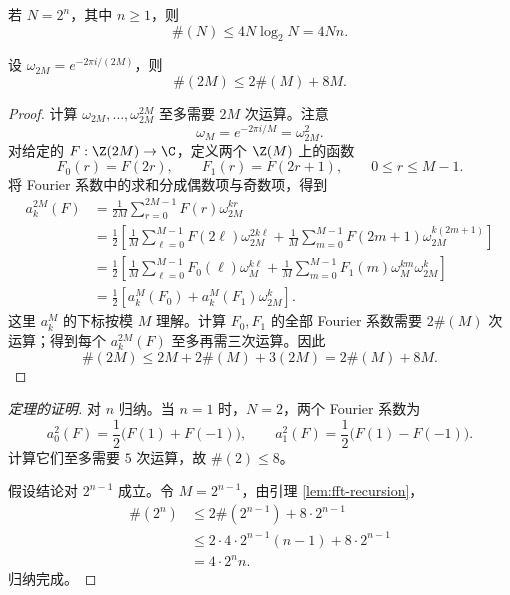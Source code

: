 \begin{theorem}
	\label{thm:fft-complexity}
	若 $N=2^n$，其中 $n\geq1$，则
	\[
	\#(N)\leq4N\log_2N=4Nn.
	\]
\end{theorem}

\begin{lemma}\label{lem:fft-recursion}
	设 $\omega_{2M}=e^{-2\pi i/(2M)}$，则
	\[
	\#(2M)\leq2\#(M)+8M.
	\]
\end{lemma}

\begin{proof}
	计算 $\omega_{2M},\ldots,\omega_{2M}^{2M}$ 至多需要
	$2M$ 次运算。注意
	\[
	\omega_M=e^{-2\pi i/M}=\omega_{2M}^2.
	\]
	对给定的 $F:\Z(2M)\to\C$，定义两个 $\Z(M)$ 上的函数
	\[
	F_0(r)=F(2r),
	\qquad
	F_1(r)=F(2r+1),
	\qquad 0\leq r\leq M-1.
	\]
	将 Fourier 系数中的求和分成偶数项与奇数项，得到
	\[
	\begin{aligned}
	a_k^{2M}(F)
	&=\frac1{2M}\sum_{r=0}^{2M-1}F(r)\omega_{2M}^{kr}\\
	&=\frac12\left[
	\frac1M\sum_{\ell=0}^{M-1}F(2\ell)\omega_{2M}^{2k\ell}
	+\frac1M\sum_{m=0}^{M-1}
	F(2m+1)\omega_{2M}^{k(2m+1)}
	\right]\\
	&=\frac12\left[
	\frac1M\sum_{\ell=0}^{M-1}F_0(\ell)\omega_M^{k\ell}
	+\frac1M\sum_{m=0}^{M-1}
	F_1(m)\omega_M^{km}\omega_{2M}^k
	\right]\\
	&=\frac12\left[a_k^M(F_0)+a_k^M(F_1)\omega_{2M}^k\right].
	\end{aligned}
	\]
	这里 $a_k^M$ 的下标按模 $M$ 理解。计算 $F_0,F_1$ 的全部
	Fourier 系数需要 $2\#(M)$ 次运算；得到每个
	$a_k^{2M}(F)$ 至多再需三次运算。因此
	\[
	\#(2M)\leq2M+2\#(M)+3(2M)
	=2\#(M)+8M.
	\]
\end{proof}

\begin{proof}[定理的证明]
	对 $n$ 归纳。当 $n=1$ 时，$N=2$，两个 Fourier 系数为
	\[
	a_0^2(F)=\frac12\bigl(F(1)+F(-1)\bigr),
	\qquad
	a_1^2(F)=\frac12\bigl(F(1)-F(-1)\bigr).
	\]
	计算它们至多需要 $5$ 次运算，故 $\#(2)\leq8$。

	假设结论对 $2^{n-1}$ 成立。令 $M=2^{n-1}$，由引理
	\ref{lem:fft-recursion}，
	\[
	\begin{aligned}
	\#(2^n)
	&\leq2\#(2^{n-1})+8\cdot2^{n-1}\\
	&\leq2\cdot4\cdot2^{n-1}(n-1)+8\cdot2^{n-1}\\
	&=4\cdot2^n n.
	\end{aligned}
	\]
	归纳完成。
\end{proof}

